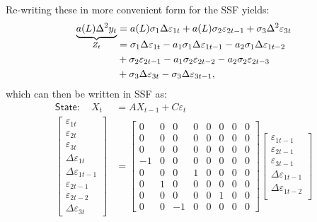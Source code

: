 \documentclass[a4paper,12pt]{article}
\begin{document}
Re-writing these in more convenient form for the SSF yields:%
\begin{align}
\underbrace{a(L)\Delta ^{2}y_{t}}_{Z_{t}}& =a(L)\sigma _{1}\Delta
\varepsilon _{1t}+a(L)\sigma _{2}\varepsilon _{2t-1}+\sigma _{3}\Delta
^{2}\varepsilon _{3t}  \label{eqZ} \\[-5mm]
& =\sigma _{1}\Delta \varepsilon _{1t}-a_{1}\sigma _{1}\Delta \varepsilon
_{1t-1}-a_{2}\sigma _{1}\Delta \varepsilon _{1t-2}  \notag \\
& +\sigma _{2}\varepsilon _{2t-1}-a_{1}\sigma _{2}\varepsilon
_{2t-2}-a_{2}\sigma _{2}\varepsilon _{2t-3}  \notag \\
& +\sigma _{3}\Delta \varepsilon _{3t}-\sigma _{3}\Delta \varepsilon _{3t-1},
\notag
\end{align}%
which can then be written in SSF as:%
\begin{align}
\mathsf{State}:\quad X_{t}& =AX_{t-1}+C\varepsilon _{t} \\
\begin{bmatrix}
\varepsilon _{1t} \\
\varepsilon _{2t} \\
\varepsilon _{3t} \\
\Delta \varepsilon _{1t} \\
\Delta \varepsilon _{1t-1} \\
\varepsilon _{2t-1} \\
\varepsilon _{2t-2} \\
\Delta \varepsilon _{3t}%
\end{bmatrix}%
& =%
\begin{bmatrix}
0 & 0 & 0 & 0 & 0 & 0 & 0 & 0 \\
0 & 0 & 0 & 0 & 0 & 0 & 0 & 0 \\
0 & 0 & 0 & 0 & 0 & 0 & 0 & 0 \\
-1 & 0 & 0 & 0 & 0 & 0 & 0 & 0 \\
0 & 0 & 0 & 1 & 0 & 0 & 0 & 0 \\
0 & 1 & 0 & 0 & 0 & 0 & 0 & 0 \\
0 & 0 & 0 & 0 & 0 & 1 & 0 & 0 \\
0 & 0 & -1 & 0 & 0 & 0 & 0 & 0%
\end{bmatrix}%
\begin{bmatrix}
\varepsilon _{1t-1} \\
\varepsilon _{2t-1} \\
\varepsilon _{3t-1} \\
\Delta \varepsilon _{1t-1} \\
\Delta \varepsilon _{1t-2} \\

\end{bmatrix}
\end{align}
\end{document}
